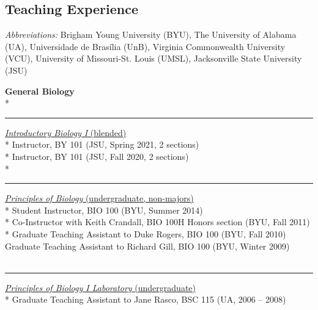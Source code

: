 \documentclass[margin,line]{res}
\begin{document}
\begin{resume}

\section{\sc Teaching Experience}

\emph{Abbreviations:} Brigham Young University (BYU), The University of Alabama (UA), Universidade de Bras\'{i}lia (UnB), Virginia Commonwealth University (VCU), University of Missouri-St. Louis (UMSL), Jacksonville State University (JSU)

\textbf{General Biology}\\*
\rule{-1mm}{5mm} \hspace*{4mm} \href{https://catalog.jsu.edu/undergraduate/science/biology/#programstext}{\textit{Introductory Biology I} (blended)}\\*
\hspace*{8mm} Instructor, BY 101 (JSU, Spring 2021, 2 sections)\\*
\hspace*{8mm} Instructor, BY 101 (JSU, Fall 2020, 2 sections)\\*
\\
\rule{-1mm}{5mm} \hspace*{4mm} \href{http://catalog.byu.edu/life-sciences/biology/principles-of-biology}{\textit{Principles of Biology} (undergraduate, non-majors)}\\*
\hspace*{8mm} Student Instructor, BIO 100 (BYU, Summer 2014)\\*
\hspace*{8mm} Co-Instructor with Keith Crandall, BIO 100H Honors section (BYU, Fall 2011)\\*
\hspace*{8mm} Graduate Teaching Assistant to Duke Rogers, BIO 100 (BYU, Fall 2010)\\
\hspace*{8mm} Graduate Teaching Assistant to Richard Gill, BIO 100 (BYU, Winter 2009)\\
~\\
\rule{-1mm}{5mm} \hspace*{4mm} \href{http://catalog.byu.edu/life-sciences/biology/principles-of-biology}{\textit{Principles of Biology I Laboratory} (undergraduate)}\\*
\hspace*{8mm} Graduate Teaching Assistant to Jane Rasco, BSC 115 (UA, 2006 -- 2008)\\

\end{resume}
\end{document}
